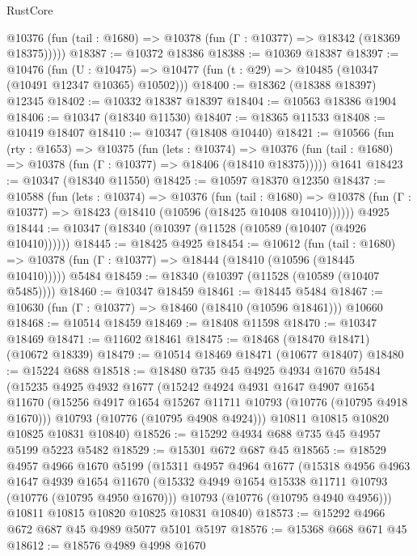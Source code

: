 \begin{lexlean}{RustCore}
\begin{coremodule}
      @10376 (fun (tail : @1680) => @10378 (fun (Γ : @10377) => @18342 (@18369 @18375)))))
@18387 := @10372 @18386
@18388 := @10369 @18387
@18397 := @10476
    (fun (U : @10475) => @10477 (fun (t : @29) => @10485 (@10347 (@10491 @12347 @10365) @10502)))
@18400 := @18362 (@18388 @18397) @12345
@18402 := @10332 @18387 @18397
@18404 := @10563 @18386 @1904
@18406 := @10347 (@18340 @11530)
@18407 := @18365 @11533
@18408 := @10419 @18407
@18410 := @10347 (@18408 @10440)
@18421 := @10566
    (fun (rty : @1653) =>
    @10375
      (fun (lets : @10374) =>
      @10376 (fun (tail : @1680) => @10378 (fun (Γ : @10377) => @18406 (@18410 @18375)))))
    @1641
@18423 := @10347 (@18340 @11550)
@18425 := @10597 @18370 @12350
@18437 := @10588
    (fun (lets : @10374) =>
    @10376
      (fun (tail : @1680) =>
      @10378 (fun (Γ : @10377) => @18423 (@18410 (@10596 (@18425 @10408 @10410))))))
    @4925
@18444 := @10347 (@18340 (@10397 (@11528 (@10589 (@10407 (@4926 @10410))))))
@18445 := @18425 @4925
@18454 := @10612
    (fun (tail : @1680) => @10378 (fun (Γ : @10377) => @18444 (@18410 (@10596 (@18445 @10410)))))
    @5484
@18459 := @18340 (@10397 (@11528 (@10589 (@10407 @5485))))
@18460 := @10347 @18459
@18461 := @18445 @5484
@18467 := @10630 (fun (Γ : @10377) => @18460 (@18410 (@10596 @18461))) @10660
@18468 := @10514 @18459
@18469 := @18408 @11598
@18470 := @10347 @18469
@18471 := @11602 @18461
@18475 := @18468 (@18470 @18471) (@10672 @18339)
@18479 := @10514 @18469 @18471 (@10677 @18407)
@18480 := @15224 @688
@18518 := @18480
    @735
    @45
    @4925
    @4934
    @1670
    @5484
    (@15235
      @4925
      @4932
      @1677
      (@15242
        @4924
        @4931
        @1647
        @4907
        @1654
        @11670
        (@15256 @4917 @1654 @15267 @11711 @10793 (@10776 (@10795 @4918 @1670)))
        @10793
        (@10776 (@10795 @4908 @4924)))
      @10811
      @10815
      @10820
      @10825
      @10831
      @10840)
@18526 := @15292 @4934 @688 @735 @45 @4957 @5199 @5223 @5482
@18529 := @15301 @672 @687 @45
@18565 := @18529
    @4957
    @4966
    @1670
    @5199
    (@15311
      @4957
      @4964
      @1677
      (@15318
        @4956
        @4963
        @1647
        @4939
        @1654
        @11670
        (@15332 @4949 @1654 @15338 @11711 @10793 (@10776 (@10795 @4950 @1670)))
        @10793
        (@10776 (@10795 @4940 @4956)))
      @10811
      @10815
      @10820
      @10825
      @10831
      @10840)
@18573 := @15292 @4966 @672 @687 @45 @4989 @5077 @5101 @5197
@18576 := @15368 @668 @671 @45
@18612 := @18576
    @4989
    @4998
    @1670

\end{coremodule}
\end{lexlean}

